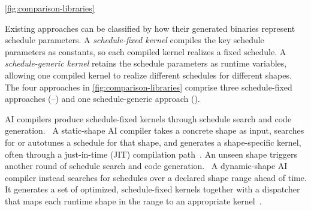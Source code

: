 {\color{red}%
\autoref{fig:comparison-libraries}
\par}
{\color{blue}%
Existing approaches can be classified by how their generated binaries represent schedule parameters. A \emph{schedule-fixed kernel} compiles the key schedule parameters as constants, so each compiled kernel realizes a fixed schedule. A \emph{schedule-generic kernel} retains the schedule parameters as runtime variables, allowing one compiled kernel to realize different schedules for different shapes. The four approaches in \autoref{fig:comparison-libraries} comprise three schedule-fixed approaches (--) and one schedule-generic approach ().
\par}



{\color{red}%
\mbox{\cite{tillet2019triton,chen2018tvm,zheng2022dietcode,shen2021nimble,zheng2023bladedisc}}\hspace{0pt}\mbox{\cite{tillet2019triton}}\hspace{0pt}\mbox{\cite{Lai2023RelaxCA}}\hspace{0pt}
\par}
{\color{blue}%
AI compilers produce schedule-fixed kernels through schedule search and code generation. ~A static-shape AI compiler takes a concrete shape as input, searches for or autotunes a schedule for that shape, and generates a shape-specific kernel, often through a just-in-time (JIT) compilation path~\cite{chen2018autotvm,zheng2020ansor,tilelang,tillet2019triton}. An unseen shape triggers another round of schedule search and code generation. ~A dynamic-shape AI compiler instead searches for schedules over a declared shape range ahead of time. It generates a set of optimized, schedule-fixed kernels together with a dispatcher that maps each runtime shape in the range to an appropriate kernel~\cite{zheng2022dietcode,shen2021nimble,zheng2023bladedisc,Lai2023RelaxCA}.
\par}

